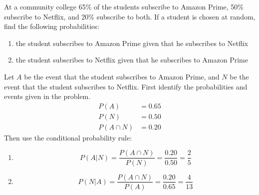 \begin{example}
    At a community college 65\% of the students subscribe to Amazon Prime, 50\% subscribe to Netflix, and 20\% subscribe to both. If a student is chosen at random, find the following probabilities:
    \begin{enumerate}
        \item the student subscribes to Amazon Prime given that he subscribes to Netflix
        \item the student subscribes to Netflix given that he subscribes to Amazon Prime
    \end{enumerate}
\end{example}

\begin{solution}
    Let \( A \) be the event that the student subscribes to Amazon Prime, and \( N \) be the event that the student subscribes to Netflix. First identify the probabilities and events given in the problem.
    \begin{align*}
        P(A)        & = 0.65 \\
        P(N)        & = 0.50 \\
        P(A \cap N) & = 0.20
    \end{align*}
    Then use the conditional probability rule:
    \begin{enumerate}
        \item \[ P(A | N) = \frac{P(A \cap N)}{P(N)} = \frac{0.20}{0.50} = \frac{2}{5} \]
        \item \[ P(N | A) = \frac{P(A \cap N)}{P(A)} = \frac{0.20}{0.65} = \frac{4}{13} \]
    \end{enumerate}
\end{solution}